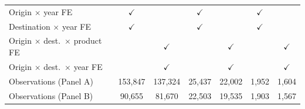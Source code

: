 \begin{tabular}{lcccccc}
Origin $\times$ year FE & $\checkmark$ &  & $\checkmark$ &  & $\checkmark$ &  \\
Destination $\times$ year FE & $\checkmark$ &  & $\checkmark$ &  & $\checkmark$ &  \\
Origin $\times$ dest.\ $\times$ product FE &  & $\checkmark$ &  & $\checkmark$ &  & $\checkmark$ \\
Origin $\times$ dest.\ $\times$ year FE &  & $\checkmark$ &  & $\checkmark$ &  & $\checkmark$ \\
Observations (Panel A) & 153,847 & 137,324 & 25,437 & 22,002 & 1,952 & 1,604 \\
Observations (Panel B) & 90,655 & 81,670 & 22,503 & 19,535 & 1,903 & 1,567 \\
\hline
\end{tabular}
